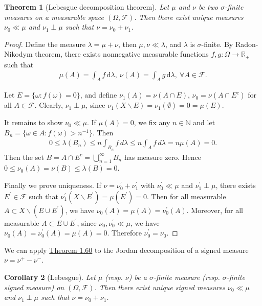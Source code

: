 \documentclass{article}
\numberwithin{equation}{section}
\newcommand{\bbN}{\mathbb{N}}
\renewcommand{\d}{\mathrm{d}}
\theoremstyle{plain}
\newtheorem{theorem}{Theorem}[section]
\newtheorem{corollary}[theorem]{Corollary}
\theoremstyle{definition}
\begin{document}
\begin{theorem}[Lebesgue decomposition theorem]\label{thm:1.60} Let $\mu$ and $\nu$ be two $\sigma$-finite measures on a measurable space $(\Omega,\mathscr{F})$. Then there exist unique measures $\nu_0\ll\mu$ and $\nu_1\perp\mu$ such that $\nu=\nu_0+\nu_1$.
\end{theorem}
\begin{proof}
Define the measure $\lambda=\mu+\nu$, then $\mu,\nu\ll\lambda$, and $\lambda$ is $\sigma$-finite. By Radon-Nikodym theorem, there exists nonnegative measurable functions $f,g:\Omega\to\mathbb{R}_+$ such that
\begin{align*}
	\mu(A)=\int_A f\,\d \lambda,\ \nu(A)=\int_A g\,\d \lambda,\ \forall A\in\mathscr{F}.
\end{align*}

Let $E=\{\omega:f(\omega)=0\}$, and define $\nu_1(A)=\nu(A\cap E)$, $\nu_0=\nu(A\cap E^c)$ for all $A\in\mathscr{F}$. Clearly, $\nu_1\perp\mu$, since $\nu_1(X\backslash E)=\nu_1(\emptyset)=0=\mu(E)$. 

It remains to show $\nu_0\ll\mu$. If $\mu(A)=0$, we fix any $n\in\bbN$ and let $B_n=\{\omega\in A:f(\omega)>n^{-1}\}$. Then
\begin{align*}
	0\leq\lambda(B_n)\leq n\int_{B_n} f\,d\lambda\leq n\int_A f\,d\lambda=n\mu(A)=0.
\end{align*}
Then the set $B=A\cap E^c=\bigcup_{n=1}^\infty B_n$ has measure zero. Hence $0\leq\nu_0(A)=\nu(B)\leq\lambda(B)=0$.

Finally we prove uniqueness. If $\nu=\nu_0^\prime+\nu_1^\prime$ with $\nu_0^\prime\ll\mu$ and $\nu_1^\prime\perp\mu$, there exists $E^\prime\in\mathscr{F}$ such that $\nu_1^\prime(X\backslash E^\prime)=\mu(E^\prime)=0$. Then for all measurable $A\subset X\backslash(E\cup E^\prime)$, we have $\nu_0(A)=\mu(A)=\nu_0^\prime(A)$. Moreover, for all measurable $A\subset E\cup E^\prime$, since $\nu_0,\nu_0^\prime\ll\mu$, we have $\nu_0(A)=\nu_0^\prime(A)=\mu(A)=0$. Therefore $\nu_0^\prime=\nu_0$.
\end{proof}

We can apply \hyperref[thm:1.60]{Theorem 1.60} to the Jordan decomposition of a signed measure $\nu=\nu^+ - \nu^-$.

\begin{corollary}[Lebesgue]\label{cor:1.60} Let $\mu$ (resp. $\nu$) be a $\sigma$-finite measure (resp. $\sigma$-finite signed measure) on $(\Omega,\mathscr{F})$. Then there exist unique signed measures $\nu_0\ll\mu$ and $\nu_1\perp\mu$ such that $\nu=\nu_0+\nu_1$.
\end{corollary}
\end{document}
